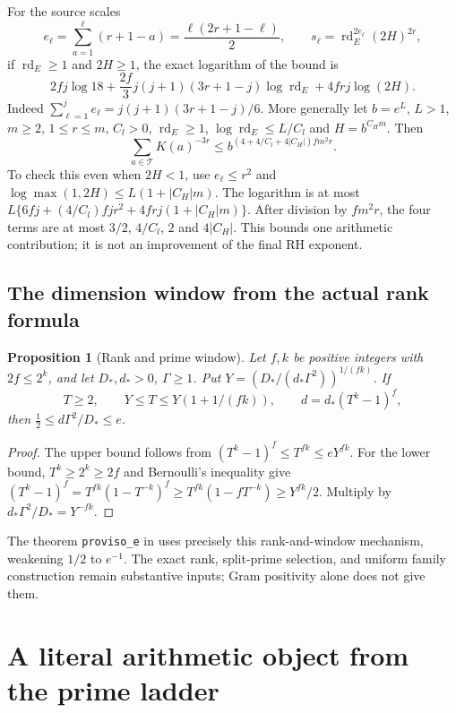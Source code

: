 \documentclass[11pt,letterpaper]{article}
\newtheorem{proposition}[theorem]{Proposition}
\theoremstyle{definition}
\theoremstyle{remark}
\numberwithin{equation}{section}
\begin{document}
For the source scales
\[
 e_\ell=\sum_{a=1}^\ell(r+1-a)=\frac{\ell(2r+1-\ell)}2,
 \qquad s_\ell=\operatorname{rd}_E^{2e_\ell}(2H)^{2r},
\]
if $\operatorname{rd}_E\ge1$ and $2H\ge1$, the exact logarithm of the bound is
\begin{equation}\label{eq:packing-cost}
 2fj\log18+\frac{2f}{3}j(j+1)(3r+1-j)\log\operatorname{rd}_E
       +4frj\log(2H).
\end{equation}
Indeed $\sum_{\ell=1}^je_\ell=j(j+1)(3r+1-j)/6$. More generally let $b=e^L$, $L>1$, $m\ge2$, $1\le r\le m$, $C_l>0$, $\operatorname{rd}_E\ge1$, $\log\operatorname{rd}_E\le L/C_l$ and $H=b^{C_Hm}$. Then
\begin{equation}\label{eq:packing-coarse}
 \sum_{a\in\mathcal T}K(a)^{-3r}
 \le b^{(4+4/C_l+4|C_H|)fm^2r}.
\end{equation}
To check this even when $2H<1$, use $e_\ell\le r^2$ and
$\log\max(1,2H)\le L(1+|C_H|m)$. The logarithm is at most
$L\{6fj+(4/C_l)fjr^2+4frj(1+|C_H|m)\}$.
After division by $fm^2r$, the four terms are at most $3/2$, $4/C_l$, $2$ and $4|C_H|$. This bounds one arithmetic contribution; it is not an improvement of the final RH exponent.

\subsection{The dimension window from the actual rank formula}
\begin{proposition}[Rank and prime window]\label{prop:dimension}
Let $f,k$ be positive integers with $2f\le2^k$, and let $D_*,d_*>0$, $\Gamma\ge1$. Put $Y=(D_*/(d_*\Gamma^2))^{1/(fk)}$. If
\[
 T\ge2,\qquad Y\le T\le Y(1+1/(fk)),\qquad d=d_*(T^k-1)^f,
\]
then $\tfrac12\le d\Gamma^2/D_*\le e$.
\end{proposition}
\begin{proof}
The upper bound follows from $(T^k-1)^f\le T^{fk}\le eY^{fk}$. For the lower bound, $T^k\ge2^k\ge2f$ and Bernoulli's inequality give
$(T^k-1)^f=T^{fk}(1-T^{-k})^f\ge T^{fk}(1-fT^{-k})\ge Y^{fk}/2$.
Multiply by $d_*\Gamma^2/D_*=Y^{-fk}$.
\end{proof}
The theorem \texttt{proviso\_e} in  uses precisely this rank-and-window mechanism, weakening $1/2$ to $e^{-1}$. The exact rank, split-prime selection, and uniform family construction remain substantive inputs; Gram positivity alone does not give them.

\section{A literal arithmetic object from the prime ladder}
\end{document}
